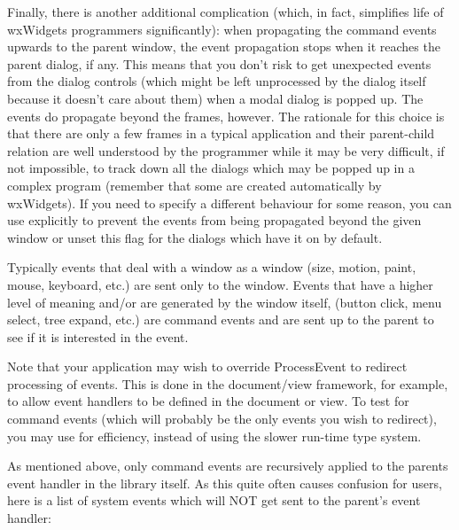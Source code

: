 Finally, there is another additional complication (which, in fact, simplifies
life of wxWidgets programmers significantly): when propagating the command
events upwards to the parent window, the event propagation stops when it
reaches the parent dialog, if any. This means that you don't risk to get
unexpected events from the dialog controls (which might be left unprocessed by
the dialog itself because it doesn't care about them) when a modal dialog is
popped up. The events do propagate beyond the frames, however. The rationale
for this choice is that there are only a few frames in a typical application
and their parent-child relation are well understood by the programmer while it
may be very difficult, if not impossible, to track down all the dialogs which
may be popped up in a complex program (remember that some are created
automatically by wxWidgets). If you need to specify a different behaviour for
some reason, you can use 
explicitly to prevent the events from being propagated beyond the given window
or unset this flag for the dialogs which have it on by default.

Typically events that deal with a window as a window (size, motion,
paint, mouse, keyboard, etc.) are sent only to the window.  Events
that have a higher level of meaning and/or are generated by the window
itself, (button click, menu select, tree expand, etc.) are command
events and are sent up to the parent to see if it is interested in the
event.

Note that your application may wish to override ProcessEvent to redirect processing of
events. This is done in the document/view framework, for example, to allow event handlers
to be defined in the document or view. To test for command events (which will probably
be the only events you wish to redirect), you may use 
 for efficiency, 
instead of using the slower run-time type system.

As mentioned above, only command events are recursively applied to the parents event
handler in the library itself. As this quite often causes confusion for users,
here is a list of system events which will NOT get sent to the parent's event handler:

